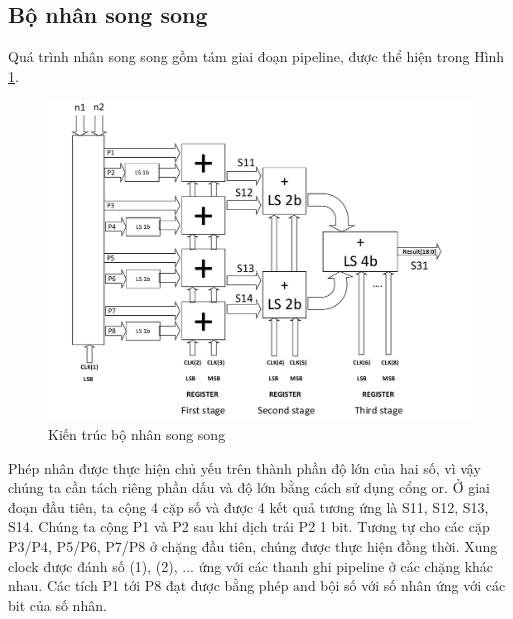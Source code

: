 \documentclass[conference]{IEEEtran}
\begin{document}
	\subsection{Bộ nhân song song}
	Quá trình nhân song song gồm tám giai đoạn pipeline,  được thể hiện trong Hình \ref{mul}.\\
	\begin{figure}[h]
		\includegraphics[width=\linewidth]{Figures/mul.pdf}
		\caption{Kiến trúc bộ nhân song song} 
		\label{mul}
	\end{figure}
	Phép nhân được thực hiện chủ yếu trên thành phần độ lớn của hai số, vì vậy chúng ta cần tách riêng phần dấu và độ lớn bằng cách sử dụng cổng or. Ở giai đoạn đầu tiên, ta cộng 4 cặp số và được 4 kết quả tương ứng là S11, S12, S13, S14. Chúng ta cộng P1 và P2 sau khi dịch trái P2 1 bit. Tương tự cho các cặp P3/P4, P5/P6, P7/P8 ở chặng đầu tiên, chúng được thực hiện đồng thời. Xung clock được đánh số (1), (2), ... ứng với các thanh ghi pipeline ở các chặng khác nhau. Các tích P1 tới P8 đạt được bằng phép $\text{and}$ bội số với số nhân ứng với các bit của số nhân.
\end{document}
